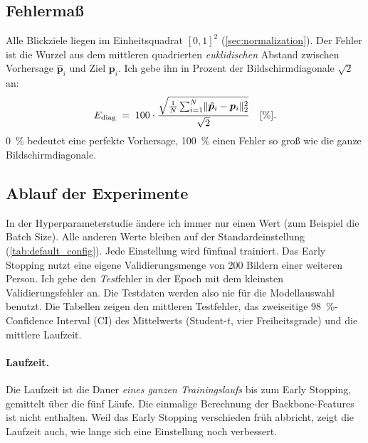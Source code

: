 \subsection{Fehlermaß}
\label{sec:metric}

Alle Blickziele liegen im Einheitsquadrat $[0,1]^2$ (\cref{sec:normalization}).
Der Fehler ist die Wurzel aus dem mittleren quadrierten \emph{euklidischen}
Abstand zwischen Vorhersage $\hat{\bm p}_i$ und Ziel $\bm p_i$. Ich gebe ihn in
Prozent der Bildschirmdiagonale $\sqrt{2}$ an:
\begin{equation}
  E_{\mathrm{diag}} \;=\; 100\cdot
  \frac{\sqrt{\frac{1}{N}\sum_{i=1}^{N}\lVert\hat{\bm p}_i-\bm p_i\rVert_2^{2}}}{\sqrt{2}}
  \quad[\%].
  \label{eq:ediag}
\end{equation}
\SI{0}{\percent} bedeutet eine perfekte Vorhersage, \SI{100}{\percent} einen
Fehler so groß wie die ganze Bildschirmdiagonale.

\subsection{Ablauf der Experimente}
\label{sec:protocol}

In der Hyperparameterstudie ändere ich immer nur einen Wert (zum Beispiel die Batch Size). Alle anderen
Werte bleiben auf der Standardeinstellung (\cref{tab:default_config}). Jede
Einstellung wird fünfmal trainiert. Das Early Stopping nutzt eine eigene
Validierungsmenge von 200 Bildern einer weiteren Person. Ich gebe den
\emph{Test}fehler in der Epoch mit dem kleinsten Validierungsfehler an. Die
Testdaten werden also nie für die Modellauswahl benutzt. Die Tabellen zeigen
den mittleren Testfehler, das zweiseitige \SI{98}{\percent}-Confidence Interval
(CI) des Mittelwerts (Student-$t$, vier Freiheitsgrade) und die mittlere
Laufzeit.

\paragraph{Laufzeit.} Die Laufzeit ist die Dauer \emph{eines ganzen
Trainingslaufs} bis zum Early Stopping, gemittelt über die fünf Läufe. Die
einmalige Berechnung der Backbone-Features ist nicht enthalten. Weil das Early
Stopping verschieden früh abbricht, zeigt die Laufzeit auch, wie lange sich eine
Einstellung noch verbessert.

